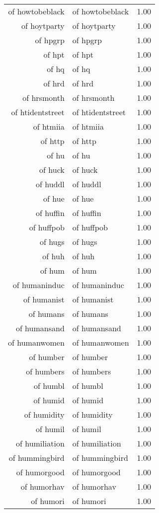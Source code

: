\begin{table}[ht]
\begin{tabular}{rlr}
  of howtobeblack & of howtobeblack & 1.00 \\ 
  of hoytparty & of hoytparty & 1.00 \\ 
  of hpgrp & of hpgrp & 1.00 \\ 
  of hpt & of hpt & 1.00 \\ 
  of hq & of hq & 1.00 \\ 
  of hrd & of hrd & 1.00 \\ 
  of hrsmonth & of hrsmonth & 1.00 \\ 
  of htidentstreet & of htidentstreet & 1.00 \\ 
  of htmiia & of htmiia & 1.00 \\ 
  of http & of http & 1.00 \\ 
  of hu & of hu & 1.00 \\ 
  of huck & of huck & 1.00 \\ 
  of huddl & of huddl & 1.00 \\ 
  of hue & of hue & 1.00 \\ 
  of huffin & of huffin & 1.00 \\ 
  of huffpob & of huffpob & 1.00 \\ 
  of hugs & of hugs & 1.00 \\ 
  of huh & of huh & 1.00 \\ 
  of hum & of hum & 1.00 \\ 
  of humaninduc & of humaninduc & 1.00 \\ 
  of humanist & of humanist & 1.00 \\ 
  of humans & of humans & 1.00 \\ 
  of humansand & of humansand & 1.00 \\ 
  of humanwomen & of humanwomen & 1.00 \\ 
  of humber & of humber & 1.00 \\ 
  of humbers & of humbers & 1.00 \\ 
  of humbl & of humbl & 1.00 \\ 
  of humid & of humid & 1.00 \\ 
  of humidity & of humidity & 1.00 \\ 
  of humil & of humil & 1.00 \\ 
  of humiliation & of humiliation & 1.00 \\ 
  of hummingbird & of hummingbird & 1.00 \\ 
  of humorgood & of humorgood & 1.00 \\ 
  of humorhav & of humorhav & 1.00 \\ 
  of humori & of humori & 1.00 \\ 

\end{tabular}
\end{table}
